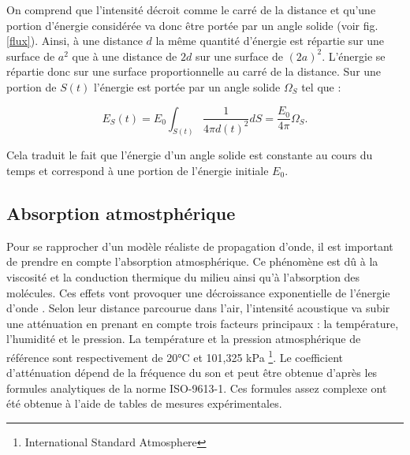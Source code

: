 On comprend que l'intensité décroit comme le carré de la distance et qu'une portion d'énergie considérée va donc être portée par un angle solide (voir fig. \ref{flux}). Ainsi, à une distance $d$ la même quantité d'énergie est répartie sur une surface de $a^2$ que à une distance de $2d$ sur une surface de $(2a)^2$. L'énergie se répartie donc sur une surface proportionnelle au carré de la distance. Sur une portion de $S(t)$ l'énergie est portée par un angle solide $\Omega_{S}$ tel que :

\begin{equation} \label{eq_energie}
E_{S}(t) = E_0 \int_{S(t)}  \frac{1}{4\pi  d(t)^2} dS = \frac{E_0}{4\pi}  \Omega_{S}.
\end{equation}

Cela traduit le fait que l'énergie d'un angle solide est constante au cours du temps et correspond à une portion de l'énergie initiale $E_0$.





\subsection{Absorption atmostphérique}
 \label{sect_absAIr}
Pour se rapprocher d'un modèle réaliste de propagation d'onde, il est important de prendre en compte l'absorption atmosphérique. Ce phénomène est dû à la viscosité et la conduction thermique du milieu ainsi qu'à l'absorption des molécules. Ces effets vont provoquer une décroissance exponentielle de l'énergie d'onde \cite[p. 68-70]{jouhaneau}. Selon leur distance parcourue dans l'air, l'intensité acoustique va subir une atténuation en prenant en compte trois facteurs principaux : la température, l'humidité et le pression. La température et la pression atmosphérique de référence sont respectivement de 20°C et 101,325 kPa \footnote{International Standard Atmosphere}. Le coefficient d'atténuation dépend de la fréquence du son et peut être obtenue d'après les formules analytiques de la norme ISO-9613-1. Ces formules assez complexe ont été obtenue à l'aide de tables de mesures expérimentales.

